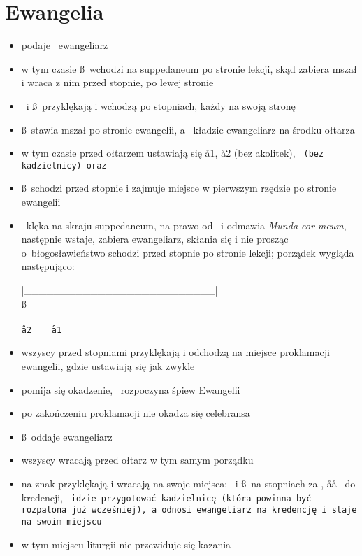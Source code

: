 \section{Ewangelia}

\begin{itemize}
	\item {} podaje \dd~ewangeliarz
	\item w tym czasie \ss~wchodzi na suppedaneum po stronie lekcji, skąd
		zabiera mszał i wraca z nim przed stopnie, po lewej stronie \dd
	\item \dd~i \ss~przyklękają i wchodzą po stopniach, każdy na swoją stronę
	\item \ss~stawia mszał po stronie ewangelii, a \dd~kładzie ewangeliarz na
		środku ołtarza
	\item w tym czasie przed ołtarzem ustawiają się \aa1, \aa2 (bez akolitek),
		\tt~(bez kadzielnicy) oraz 
	\item \ss~schodzi przed stopnie i zajmuje miejsce w pierwszym rzędzie po
		stronie ewangelii
	\item \dd~klęka na skraju suppedaneum, na prawo od \ii~i odmawia
		\textit{Munda cor meum}, następnie wstaje, zabiera ewangeliarz,
		skłania się i nie prosząc o błogosławieństwo schodzi przed
		stopnie po stronie lekcji; porządek wygląda następująco:
		\begin{center}
			|\_\_\_\_\_\_\_\_\_\_\_\_\_\_\_\_\_\_\_\_\_\_\_\_\_\_|\\
			\ss~~~~\dd\\
			~~~~\tt\\
			\aa2~~~~\aa1
		\end{center}
	\item wszyscy przed stopniami przyklękają i odchodzą na miejsce proklamacji
		ewangelii, gdzie ustawiają się jak zwykle
	\item pomija się okadzenie, \dd~rozpoczyna śpiew Ewangelii
	\item po zakończeniu proklamacji nie okadza się celebransa
	\item \ss~oddaje ewangeliarz  
	\item wszyscy wracają przed ołtarz w tym samym porządku
	\item na znak  przyklękają i wracają na swoje miejsca: \dd~i \ss~na stopniach
		za \ii, \aa\aa~ do kredencji, \tt~idzie przygotować kadzielnicę (która
		powinna być rozpalona już wcześniej), a  odnosi ewangeliarz na
		kredencję i staje na swoim miejscu
	\item w tym miejscu liturgii nie przewiduje się kazania
\end{itemize}

